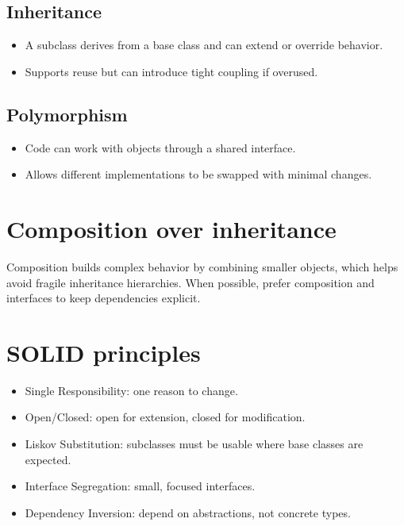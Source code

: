 \documentclass[letterpaper,10pt,english]{sphinxmanual}
\begin{document}
\subsection{Inheritance}
\label{\detokenize{appendix_a_object_oriented_programming:inheritance}}\begin{itemize}
\item {} 
\sphinxAtStartPar
A subclass derives from a base class and can extend or override behavior.

\item {} 
\sphinxAtStartPar
Supports reuse but can introduce tight coupling if overused.

\end{itemize}


\subsection{Polymorphism}
\label{\detokenize{appendix_a_object_oriented_programming:polymorphism}}\begin{itemize}
\item {} 
\sphinxAtStartPar
Code can work with objects through a shared interface.

\item {} 
\sphinxAtStartPar
Allows different implementations to be swapped with minimal changes.

\end{itemize}


\section{Composition over inheritance}
\label{\detokenize{appendix_a_object_oriented_programming:composition-over-inheritance}}
\sphinxAtStartPar
Composition builds complex behavior by combining smaller objects, which helps
avoid fragile inheritance hierarchies. When possible, prefer composition and
interfaces to keep dependencies explicit.


\section{SOLID principles}
\label{\detokenize{appendix_a_object_oriented_programming:solid-principles}}\begin{itemize}
\item {} 
\sphinxAtStartPar
Single Responsibility: one reason to change.

\item {} 
\sphinxAtStartPar
Open/Closed: open for extension, closed for modification.

\item {} 
\sphinxAtStartPar
Liskov Substitution: subclasses must be usable where base classes are expected.

\item {} 
\sphinxAtStartPar
Interface Segregation: small, focused interfaces.

\item {} 
\sphinxAtStartPar
Dependency Inversion: depend on abstractions, not concrete types.

\end{itemize}
\end{document}
